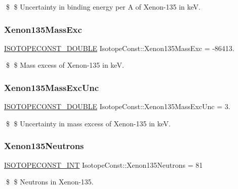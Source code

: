 \$ \$ Uncertainty in binding energy per A of Xenon-\/135 in keV. \mbox{\label{group___isotope_const-_xenon-_xe135_gaf8e623a9dcc4e675956e7de476e76829}} 
\subsubsection{\texorpdfstring{Xenon135\+Mass\+Exc}{Xenon135MassExc}}
{\footnotesize\ttfamily \mbox{\hyperlink{group___isotope_const-_macros_ga8f45a7272ce02c0b4c65c44636ed719a}{I\+S\+O\+T\+O\+P\+E\+C\+O\+N\+S\+T\+\_\+\+D\+O\+U\+B\+LE}} Isotope\+Const\+::\+Xenon135\+Mass\+Exc = -\/86413.}

\$ \$ Mass excess of Xenon-\/135 in keV. \mbox{\label{group___isotope_const-_xenon-_xe135_ga78b57a9f54bc3684ab3a6ee679326113}} 
\subsubsection{\texorpdfstring{Xenon135\+Mass\+Exc\+Unc}{Xenon135MassExcUnc}}
{\footnotesize\ttfamily \mbox{\hyperlink{group___isotope_const-_macros_ga8f45a7272ce02c0b4c65c44636ed719a}{I\+S\+O\+T\+O\+P\+E\+C\+O\+N\+S\+T\+\_\+\+D\+O\+U\+B\+LE}} Isotope\+Const\+::\+Xenon135\+Mass\+Exc\+Unc = 3.}

\$ \$ Uncertainty in mass excess of Xenon-\/135 in keV. \mbox{\label{group___isotope_const-_xenon-_xe135_ga17117713d39af128225f39024e4b84a9}} 
\subsubsection{\texorpdfstring{Xenon135\+Neutrons}{Xenon135Neutrons}}
{\footnotesize\ttfamily \mbox{\hyperlink{group___isotope_const-_macros_ga5f18360b3e99483a35c32d789e62621c}{I\+S\+O\+T\+O\+P\+E\+C\+O\+N\+S\+T\+\_\+\+I\+NT}} Isotope\+Const\+::\+Xenon135\+Neutrons = 81}

\$ \$ Neutrons in Xenon-\/135. \mbox{\label{group___isotope_const-_xenon-_xe135_ga3693f1c28669c46588ead8648ee19275}} 
